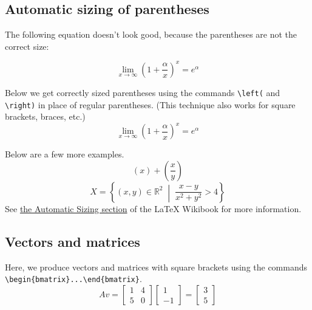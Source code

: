 \documentclass[11pt]{amsart}
\theoremstyle{definition}                  %
\theoremstyle{remark}                       %
\numberwithin{equation}{section}
\newcommand{\R}{\mathbb{R}}
\begin{document}
\subsection{Automatic sizing of parentheses}
The following equation doesn't look  good, because the parentheses
are not the correct size: 

\begin{equation}
\lim_{x \rightarrow \infty} (1+\frac{\alpha}{x})^x = e^\alpha
\end{equation}

Below we get correctly sized parentheses using the commands
\verb,\left(, and \verb,\right), in place of regular
parentheses. (This technique also works for 
square brackets, braces, etc.)
\begin{equation}
\lim_{x \rightarrow \infty} \left(1+\frac{\alpha}{x}\right)^x = e^\alpha
\end{equation}

Below are a few more examples.
\begin{equation}
\left( x \right) + \left( \frac{x}{y} \right) 
\end{equation}
\begin{equation}
X=\left\{(x,y)\in \R^2\; \middle|\; \frac{x-y}{x^2+y^2}>4\right\}
\end{equation}
See \href{https://en.wikibooks.org/wiki/LaTeX/Mathematics#Automatic_sizing}{the Automatic Sizing section} of the LaTeX Wikibook \cite{wikibook} for more information.



\subsection{Vectors and matrices}

Here, we produce vectors and matrices with square brackets using the commands
\verb,\begin{bmatrix}...\end{bmatrix},.
\begin{equation}
Av = \begin{bmatrix} 1 & 4 \\ 5 & 0 \end{bmatrix} \begin{bmatrix} 1 \\ -1\end{bmatrix}
   = \begin{bmatrix} 3 \\ 5\end{bmatrix} 
\end{equation}
\end{document}
